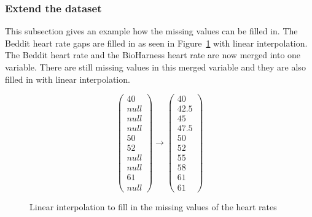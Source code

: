 		\subsubsection{Extend the dataset}
			This subsection gives an example how the missing values can be filled in.	The Beddit heart rate gaps are filled in as seen in Figure~\ref{fig:lin} with linear interpolation. The Beddit heart rate and the BioHarness heart rate are now merged into one variable. There are still missing values in this merged variable and they are also filled in with linear interpolation.

			\begin{figure}[h!]
			\[ 
				\left(
				\begin{array}{c}
				40 \\
				null \\
				null \\
				null \\
				50 \\
				52 \\
				null \\
				null \\
				61 \\
				null
				\end{array}
				\right)
				\to
				\left(
				\begin{array}{c}
				40 \\
				42.5 \\
				45 \\
				47.5 \\
				50 \\
				52 \\
				55 \\
				58 \\
				61 \\
				61
				\end{array}
				\right)
			\] 
			\caption{Linear interpolation to fill in the missing values of the heart rates}
			\label{fig:lin}
		\end{figure}
		
